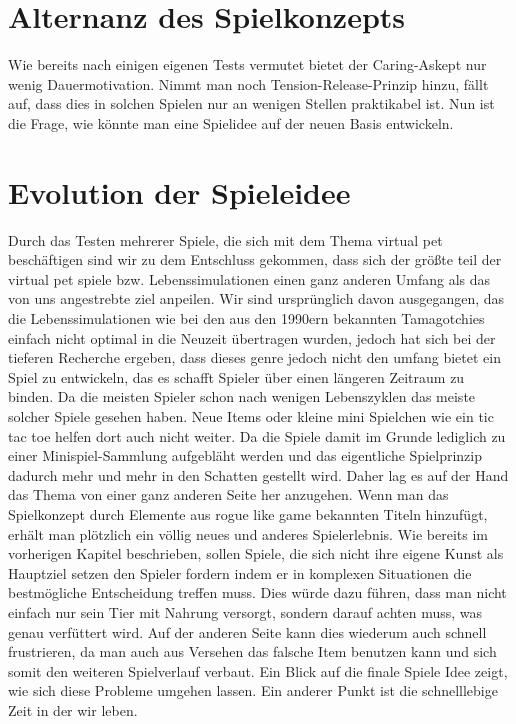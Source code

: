 \section{Alternanz des Spielkonzepts}

Wie bereits nach einigen eigenen Tests vermutet bietet der Caring-Askept nur wenig Dauermotivation. 
Nimmt man noch Tension-Release-Prinzip hinzu, fällt auf, dass dies in solchen Spielen nur an wenigen Stellen praktikabel ist.
Nun ist die Frage, wie könnte man eine Spielidee auf der neuen Basis entwickeln.




\section{Evolution der Spieleidee} 
Durch das Testen mehrerer Spiele, die sich mit dem Thema virtual pet beschäftigen sind wir zu dem Entschluss gekommen,  dass sich der größte teil der virtual pet spiele bzw. Lebenssimulationen einen ganz anderen Umfang als das von uns angestrebte ziel anpeilen. Wir sind ursprünglich davon ausgegangen, das die Lebenssimulationen wie bei den aus den 1990ern bekannten Tamagotchies einfach nicht optimal in die Neuzeit übertragen wurden, jedoch hat sich bei der tieferen Recherche ergeben, dass dieses genre jedoch nicht den umfang bietet ein Spiel zu entwickeln, das es schafft Spieler über einen längeren Zeitraum zu binden. Da die meisten Spieler schon nach wenigen Lebenszyklen das meiste solcher Spiele gesehen haben. Neue Items oder kleine mini Spielchen wie ein tic tac toe helfen dort auch nicht weiter. Da die Spiele damit im Grunde lediglich zu einer Minispiel-Sammlung aufgebläht werden und das eigentliche Spielprinzip dadurch mehr und mehr in den Schatten gestellt wird. Daher lag es auf der Hand das Thema von einer ganz anderen Seite her anzugehen. Wenn man das Spielkonzept durch Elemente aus rogue like game bekannten Titeln hinzufügt, erhält man plötzlich ein völlig neues und anderes Spielerlebnis.
Wie bereits im vorherigen Kapitel beschrieben, sollen Spiele, die sich nicht ihre eigene Kunst als Hauptziel setzen den Spieler fordern indem er in komplexen Situationen die bestmögliche Entscheidung treffen muss. Dies würde dazu führen, dass man nicht einfach nur sein Tier mit Nahrung versorgt, sondern darauf achten muss, was genau verfüttert wird. 
Auf der anderen Seite kann dies wiederum auch schnell frustrieren, da man auch aus Versehen das falsche Item benutzen kann und sich somit den weiteren Spielverlauf verbaut.
Ein Blick auf die finale Spiele Idee zeigt, wie sich diese Probleme umgehen lassen. 
Ein anderer Punkt ist die schnelllebige Zeit in der wir leben.





